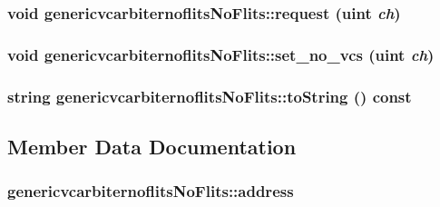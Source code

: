 \hypertarget{classgenericvcarbiternoflitsNoFlits_679b8b6bc3be8c5e28635939a10ee2b7}{
\subsubsection[{request}]{\setlength{\rightskip}{0pt plus 5cm}void genericvcarbiternoflitsNoFlits::request ({\bf uint} {\em ch})}}
\label{classgenericvcarbiternoflitsNoFlits_679b8b6bc3be8c5e28635939a10ee2b7}


\hypertarget{classgenericvcarbiternoflitsNoFlits_6d61b38c12a4dcae8137849232106541}{
\subsubsection[{set\_\-no\_\-vcs}]{\setlength{\rightskip}{0pt plus 5cm}void genericvcarbiternoflitsNoFlits::set\_\-no\_\-vcs ({\bf uint} {\em ch})}}
\label{classgenericvcarbiternoflitsNoFlits_6d61b38c12a4dcae8137849232106541}


\hypertarget{classgenericvcarbiternoflitsNoFlits_0cbe88bbc52325a3f4301bcca576e2ea}{
\subsubsection[{toString}]{\setlength{\rightskip}{0pt plus 5cm}string genericvcarbiternoflitsNoFlits::toString () const}}
\label{classgenericvcarbiternoflitsNoFlits_0cbe88bbc52325a3f4301bcca576e2ea}




\subsection{Member Data Documentation}
\hypertarget{classgenericvcarbiternoflitsNoFlits_5160d84b65185cfc3d7942ebb186982c}{
\subsubsection[{address}]{ {\bf genericvcarbiternoflitsNoFlits::address}}}
\label{classgenericvcarbiternoflitsNoFlits_5160d84b65185cfc3d7942ebb186982c}


